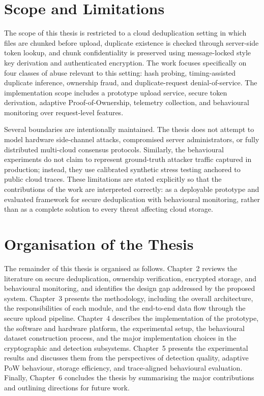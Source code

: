 \documentclass[12pt,a4paper,oneside]{report}
\begin{document}
\section{Scope and Limitations}

The scope of this thesis is restricted to a cloud deduplication setting in which files are chunked before upload, duplicate existence is checked through server-side token lookup, and chunk confidentiality is preserved using message-locked style key derivation and authenticated encryption.
The work focuses specifically on four classes of abuse relevant to this setting: hash probing, timing-assisted duplicate inference, ownership fraud, and duplicate-request denial-of-service.
The implementation scope includes a prototype upload service, secure token derivation, adaptive Proof-of-Ownership, telemetry collection, and behavioural monitoring over request-level features.

Several boundaries are intentionally maintained.
The thesis does not attempt to model hardware side-channel attacks, compromised server administrators, or fully distributed multi-cloud consensus protocols.
Similarly, the behavioural experiments do not claim to represent ground-truth attacker traffic captured in production; instead, they use calibrated synthetic stress testing anchored to public cloud traces.
These limitations are stated explicitly so that the contributions of the work are interpreted correctly: as a deployable prototype and evaluated framework for secure deduplication with behavioural monitoring, rather than as a complete solution to every threat affecting cloud storage.

\section{Organisation of the Thesis}

The remainder of this thesis is organised as follows.
Chapter~2 reviews the literature on secure deduplication, ownership verification, encrypted storage, and behavioural monitoring, and identifies the design gap addressed by the proposed system.
Chapter~3 presents the methodology, including the overall architecture, the responsibilities of each module, and the end-to-end data flow through the secure upload pipeline.
Chapter~4 describes the implementation of the prototype, the software and hardware platform, the experimental setup, the behavioural dataset construction process, and the major implementation choices in the cryptographic and detection subsystems.
Chapter~5 presents the experimental results and discusses them from the perspectives of detection quality, adaptive PoW behaviour, storage efficiency, and trace-aligned behavioural evaluation.
Finally, Chapter~6 concludes the thesis by summarising the major contributions and outlining directions for future work.
\end{document}
